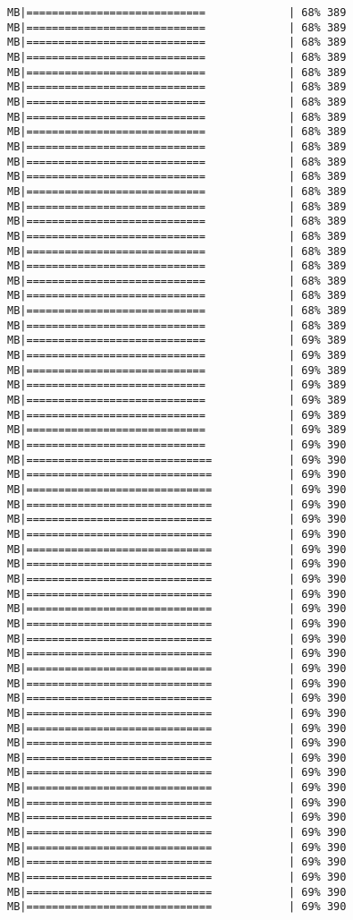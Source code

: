 \documentclass[
]{article}
\begin{document}
\begin{verbatim}
MB|============================             | 68% 389 MB|============================             | 68% 389 MB|============================             | 68% 389 MB|============================             | 68% 389 MB|============================             | 68% 389 MB|============================             | 68% 389 MB|============================             | 68% 389 MB|============================             | 68% 389 MB|============================             | 68% 389 MB|============================             | 68% 389 MB|============================             | 68% 389 MB|============================             | 68% 389 MB|============================             | 68% 389 MB|============================             | 68% 389 MB|============================             | 68% 389 MB|============================             | 68% 389 MB|============================             | 68% 389 MB|============================             | 68% 389 MB|============================             | 68% 389 MB|============================             | 68% 389 MB|============================             | 68% 389 MB|============================             | 68% 389 MB|============================             | 69% 389 MB|============================             | 69% 389 MB|============================             | 69% 389 MB|============================             | 69% 389 MB|============================             | 69% 389 MB|============================             | 69% 389 MB|============================             | 69% 389 MB|============================             | 69% 390 MB|=============================            | 69% 390 MB|=============================            | 69% 390 MB|=============================            | 69% 390 MB|=============================            | 69% 390 MB|=============================            | 69% 390 MB|=============================            | 69% 390 MB|=============================            | 69% 390 MB|=============================            | 69% 390 MB|=============================            | 69% 390 MB|=============================            | 69% 390 MB|=============================            | 69% 390 MB|=============================            | 69% 390 MB|=============================            | 69% 390 MB|=============================            | 69% 390 MB|=============================            | 69% 390 MB|=============================            | 69% 390 MB|=============================            | 69% 390 MB|=============================            | 69% 390 MB|=============================            | 69% 390 MB|=============================            | 69% 390 MB|=============================            | 69% 390 MB|=============================            | 69% 390 MB|=============================            | 69% 390 MB|=============================            | 69% 390 MB|=============================            | 69% 390 MB|=============================            | 69% 390 MB|=============================            | 69% 390 MB|=============================            | 69% 390 MB|=============================            | 69% 390 MB|=============================            | 69% 390 MB|=============================            | 69% 390 
\end{verbatim}
\end{document}
